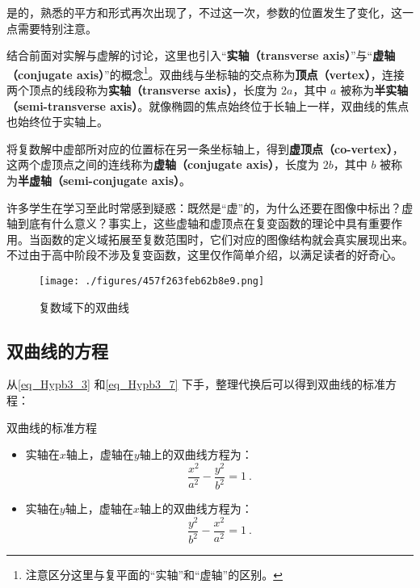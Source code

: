 是的，熟悉的平方和形式再次出现了，不过这一次，参数的位置发生了变化，这一点需要特别注意。

结合前面对实解与虚解的讨论，这里也引入“\textbf{实轴（transverse axis）}”与“\textbf{虚轴（conjugate axis）}”的概念\footnote{注意区分这里与复平面的“实轴”和“虚轴”的区别。}。双曲线与坐标轴的交点称为\textbf{顶点（vertex）}，连接两个顶点的线段称为\textbf{实轴（transverse axis）}，长度为 $2a$，其中 $a$ 被称为\textbf{半实轴（semi-transverse axis）}。就像椭圆的焦点始终位于长轴上一样，双曲线的焦点也始终位于实轴上。

将复数解中虚部所对应的位置标在另一条坐标轴上，得到\textbf{虚顶点（co-vertex）}，这两个虚顶点之间的连线称为\textbf{虚轴（conjugate axis）}，长度为 $2b$，其中 $b$ 被称为\textbf{半虚轴（semi-conjugate axis）}。

许多学生在学习至此时常感到疑惑：既然是“虚”的，为什么还要在图像中标出？虚轴到底有什么意义？事实上，这些虚轴和虚顶点在复变函数的理论中具有重要作用。当函数的定义域拓展至复数范围时，它们对应的图像结构就会真实展现出来。不过由于高中阶段不涉及复变函数，这里仅作简单介绍，以满足读者的好奇心。

\begin{figure}[ht]
\centering
\texttt{[image: ./figures/457f263feb62b8e9.png]}
\caption{复数域下的双曲线} \label{fig_Hypb3_2}
\end{figure}

\subsection{双曲线的方程}

从\autoref{eq_Hypb3_3} 和\autoref{eq_Hypb3_7} 下手，整理代换后可以得到双曲线的标准方程：

\begin{theorem}{双曲线的标准方程}
\begin{itemize}
\item 实轴在$x$轴上，虚轴在$y$轴上的双曲线方程为：
\begin{equation}\label{eq_Hypb3_4}
\frac{x^2}{a^2} - \frac{y^2}{b^2} = 1~.
\end{equation}
\item 实轴在$y$轴上，虚轴在$x$轴上的双曲线方程为：
\begin{equation}
\frac{y^2}{b^2} -\frac{x^2}{a^2}  = 1~.
\end{equation}
\end{itemize}
\end{theorem}



